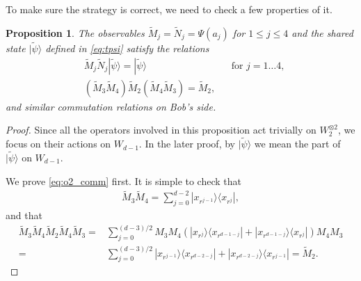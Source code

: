\documentclass[11pt,letterpaper]{article}
\newcommand{\ket}[1]{|#1\rangle}
\newcommand{\ketbra}[2]{|#1\rangle\langle#2|}
\newcommand{\x}{\otimes}
\newcommand{\1}{\mathbb{1}}
\newcommand{\tM}{\tilde{M}}
\newcommand{\tN}{\tilde{N}}
\newcommand{\tpsi}{\tilde{\psi}}
\newtheorem{proposition}[theorem]{Proposition}
\theoremstyle{definition}
\begin{document}
To make sure the strategy is correct, we need to check a few properties of it.
\begin{proposition}
The observables $\tM_j = \tN_j = \Psi(a_j)$ for $1 \leq j \leq 4$ and the shared state $\ket{\tpsi}$ defined in \cref{eq:tpsi}
satisfy the relations
\begin{align}
	\label{eq:mn_preserve} &\tM_j \tN_j \ket{\tpsi} = \ket{\tpsi} && \text{for } j = 1 \dots 4,\\
	\label{eq:o2_comm} &(\tM_3\tM_4)\tM_2(\tM_4\tM_3) = \tM_2,
\end{align}
and similar commutation relations on Bob's side.
\end{proposition}
\begin{proof}
	Since all the operators involved in this proposition act trivially on $W_2^{\x 2}$, we focus on
	their actions on $W_{d-1}$. In the later proof, by $\ket{\tpsi}$ we mean the part of $\ket{\tpsi}$ on $W_{d-1}$.
	
	We prove \cref{eq:o2_comm} first. It is simple to check that
	\begin{align*}
		\tM_3\tM_4= \sum_{j=0}^{d-2} \ketbra{x_{r^{j-1}}}{x_{r^j}},
	\end{align*}
	and that 
	\begin{align*}
		\tM_3\tM_4 \tM_2 \tM_4 \tM_3 = &\sum_{j=0}^{(d-3)/2} M_3M_4 (\ketbra{x_{r^j}}{x_{r^{d-1-j}}}+\ketbra{x_{r^{d-1-j}}}{x_{r^j}}) M_4M_3\\
		=& \sum_{j=0}^{(d-3)/2} \ketbra{x_{r^{j-1}}}{x_{r^{d-2-j}}}+\ketbra{x_{r^{d-2-j}}}{x_{r^{j-1}}} = \tM_2.
	\end{align*}
	

\end{proof}
\end{document}
